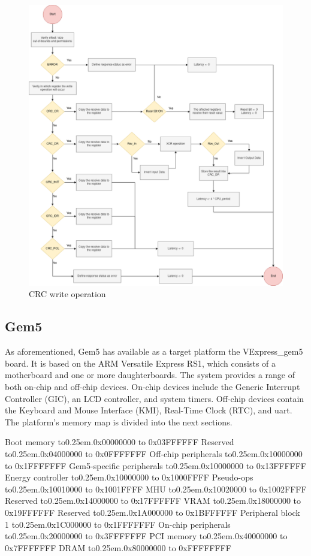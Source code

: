 \begin{figure}[t!]
	\centering
 	\includegraphics[width=0.7\linewidth]{Images/CRC_write.png}
 	\caption{CRC write operation}
	 \label{fig_CRC_write}
\end{figure}


\subsection{Gem5}

As aforementioned, Gem5 has available as a target platform the VExpress\_gem5 board. It is based on the ARM Versatile Express RS1, which 
consists of a motherboard and one or more daughterboards. The system provides a range of both on-chip and off-chip devices.
On-chip devices include the Generic Interrupt Controller (GIC), an LCD controller, and system timers.
Off-chip devices contain the Keyboard and Mouse Interface (KMI), Real-Time Clock (RTC), and \gls{uart}. 
The platform's memory map is divided into the next sections.

\def\mydots{\xleaders\hbox to0.25em{\hfill.\hfill}\hfill}

\begin{outline}[enumerate]
	\1 Boot memory 						\mydots 	0x00000000 to 0x03FFFFFF
	\1 Reserved							\mydots 	0x04000000 to 0x0FFFFFFF
	\1 Off-chip peripherals				\mydots 	0x10000000 to 0x1FFFFFFF
		\2 Gem5-specific peripherals	\mydots 	0x10000000 to 0x13FFFFFF
			\3 Energy controller 		\mydots 	0x10000000 to 0x1000FFFF
			\3 Pseudo-ops				\mydots		0x10010000 to 0x1001FFFF
			\3 MHU						\mydots		0x10020000 to 0x1002FFFF
		\2 Reserved 					\mydots 	0x14000000 to 0x17FFFFFF
		\2 VRAM							\mydots		0x18000000 to 0x19FFFFFF
		\2 Reserved 					\mydots		0x1A000000 to 0x1BFFFFFF
		\2 Peripheral block 1			\mydots		0x1C000000 to 0x1FFFFFFF
	\1 On-chip  peripherals				\mydots 	0x20000000 to 0x3FFFFFFF
	\1 PCI memory 						\mydots 	0x40000000 to 0x7FFFFFFF
	\1 DRAM								\mydots 	0x80000000 to 0xFFFFFFFF
\end{outline}

